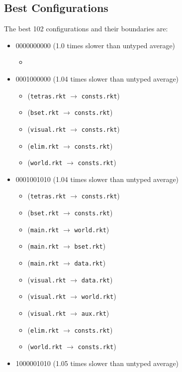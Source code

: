 \documentclass{article}
\newcommand{\mono}[1]{\texttt{#1}}
\begin{document}
\subsection{Best Configurations}
The best 102 configurations and their boundaries are:
\begin{itemize}
\item 0000000000 (1.0 times slower than untyped average)
  \begin{itemize}
  \item 
  \end{itemize}
\item 0001000000 (1.04 times slower than untyped average)
  \begin{itemize}
  \item (\mono{tetras.rkt} $\rightarrow$ \mono{consts.rkt})
  \item (\mono{bset.rkt} $\rightarrow$ \mono{consts.rkt})
  \item (\mono{visual.rkt} $\rightarrow$ \mono{consts.rkt})
  \item (\mono{elim.rkt} $\rightarrow$ \mono{consts.rkt})
  \item (\mono{world.rkt} $\rightarrow$ \mono{consts.rkt})
  \end{itemize}
\item 0001001010 (1.04 times slower than untyped average)
  \begin{itemize}
  \item (\mono{tetras.rkt} $\rightarrow$ \mono{consts.rkt})
  \item (\mono{bset.rkt} $\rightarrow$ \mono{consts.rkt})
  \item (\mono{main.rkt} $\rightarrow$ \mono{world.rkt})
  \item (\mono{main.rkt} $\rightarrow$ \mono{bset.rkt})
  \item (\mono{main.rkt} $\rightarrow$ \mono{data.rkt})
  \item (\mono{visual.rkt} $\rightarrow$ \mono{data.rkt})
  \item (\mono{visual.rkt} $\rightarrow$ \mono{world.rkt})
  \item (\mono{visual.rkt} $\rightarrow$ \mono{aux.rkt})
  \item (\mono{elim.rkt} $\rightarrow$ \mono{consts.rkt})
  \item (\mono{world.rkt} $\rightarrow$ \mono{consts.rkt})
  \end{itemize}
\item 1000001010 (1.05 times slower than untyped average)
  \begin{itemize}

\end{itemize}
\end{itemize}
\end{document}
